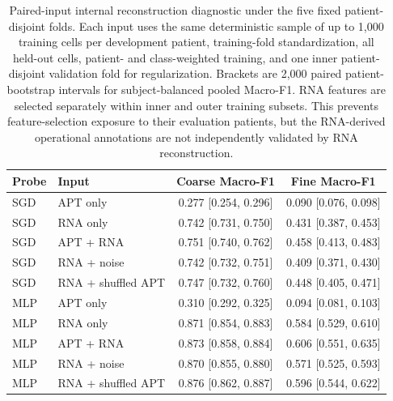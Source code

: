 \begin{table}[H]
\centering
\small
\setlength{\tabcolsep}{5pt}
\begin{tabular}{llcc}
\toprule
Probe & Input & Coarse Macro-F1 & Fine Macro-F1 \\
\midrule
SGD & APT only & 0.277 [0.254, 0.296] & 0.090 [0.076, 0.098] \\
SGD & RNA only & 0.742 [0.731, 0.750] & 0.431 [0.387, 0.453] \\
SGD & APT + RNA & 0.751 [0.740, 0.762] & 0.458 [0.413, 0.483] \\
SGD & RNA + noise & 0.742 [0.732, 0.751] & 0.409 [0.371, 0.430] \\
SGD & RNA + shuffled APT & 0.747 [0.732, 0.760] & 0.448 [0.405, 0.471] \\
\midrule
MLP & APT only & 0.310 [0.292, 0.325] & 0.094 [0.081, 0.103] \\
MLP & RNA only & 0.871 [0.854, 0.883] & 0.584 [0.529, 0.610] \\
MLP & APT + RNA & 0.873 [0.858, 0.884] & 0.606 [0.551, 0.635] \\
MLP & RNA + noise & 0.870 [0.855, 0.880] & 0.571 [0.525, 0.593] \\
MLP & RNA + shuffled APT & 0.876 [0.862, 0.887] & 0.596 [0.544, 0.622] \\
\bottomrule
\end{tabular}
\caption{Paired-input internal reconstruction diagnostic under the five fixed patient-disjoint folds. Each input uses the same deterministic sample of up to 1{,}000 training cells per development patient, training-fold standardization, all held-out cells, patient- and class-weighted training, and one inner patient-disjoint validation fold for regularization. Brackets are 2{,}000 paired patient-bootstrap intervals for subject-balanced pooled Macro-F1. RNA features are selected separately within inner and outer training subsets. This prevents feature-selection exposure to their evaluation patients, but the RNA-derived operational annotations are not independently validated by RNA reconstruction.}
\label{tab:paired_rna_oracle}
\end{table}
